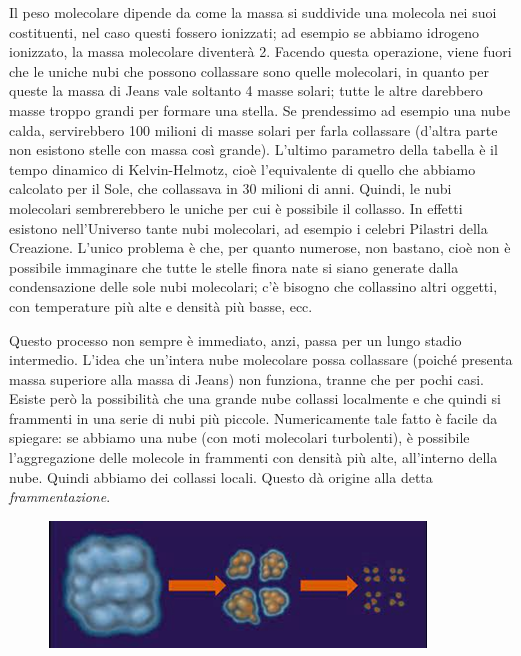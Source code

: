 Il peso molecolare dipende da come la massa si suddivide una molecola nei suoi costituenti, nel caso questi fossero ionizzati; ad esempio se abbiamo idrogeno ionizzato, la massa molecolare diventerà 2. Facendo questa operazione, viene fuori che le uniche nubi che possono collassare sono quelle molecolari, in quanto per queste la massa di Jeans vale soltanto 4 masse solari; tutte le altre darebbero masse troppo grandi per formare una stella. Se prendessimo ad esempio una nube calda, servirebbero 100 milioni di masse solari per farla collassare (d'altra parte non esistono stelle con massa così grande). L'ultimo parametro della tabella è il tempo dinamico di Kelvin-Helmotz, cioè l'equivalente di quello che abbiamo calcolato per il Sole, che collassava in 30 milioni di anni. Quindi, le nubi molecolari sembrerebbero le uniche per cui è possibile il collasso. In effetti esistono nell'Universo tante nubi molecolari, ad esempio i celebri Pilastri della Creazione. L'unico problema è che, per quanto numerose, non bastano, cioè non è possibile immaginare che tutte le stelle finora nate si siano generate dalla condensazione delle sole nubi molecolari; c'è bisogno che collassino altri oggetti, con temperature più alte e densità più basse, ecc.

Questo processo non sempre è immediato, anzi, passa per un lungo stadio intermedio. L'idea che un'intera nube molecolare possa collassare (poiché presenta massa superiore alla massa di Jeans) non funziona, tranne che per pochi casi. Esiste però la possibilità che una grande nube collassi localmente e che quindi si frammenti in una serie di nubi più piccole. Numericamente tale fatto è facile da spiegare: se abbiamo una nube (con moti molecolari turbolenti), è possibile l'aggregazione delle molecole in frammenti con densità più alte, all'interno della nube. Quindi abbiamo dei collassi locali. Questo dà origine alla detta \textit{frammentazione}.

\begin{figure}[H]
    \centering
    \includegraphics[width=10cm]{lezione 28 novembre/frammentazione.png}
    \label{lezione 28 novembre/frammentazione.png}
\end{figure}

